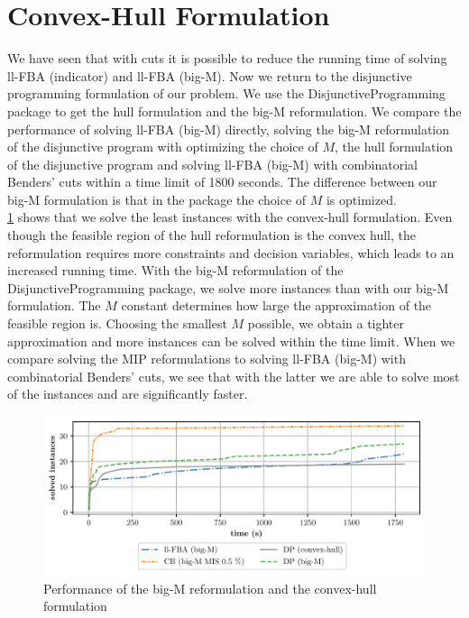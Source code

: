 \section{Convex-Hull Formulation} \label{section:results_dp}
We have seen that with cuts it is possible to reduce the running time of solving \textsf{ll-FBA (indicator)} and \textsf{ll-FBA (big-M)}. Now we return to the disjunctive programming formulation of our problem. We use the \textsf{DisjunctiveProgramming} package to get the hull formulation and the big-M reformulation. We compare the performance of solving \textsf{ll-FBA (big-M)} directly, solving the big-M reformulation of the disjunctive program with optimizing the choice of $M$, the hull formulation of the disjunctive program and solving \textsf{ll-FBA (big-M)} with combinatorial Benders' cuts within a time limit of 1800 seconds. The difference between our big-M formulation is that in the package the choice of $M$ is optimized. \\
\cref{fig:dp_performance} shows that we solve the least instances with the convex-hull formulation.  
Even though the feasible region of the hull reformulation is the convex hull, the reformulation requires more constraints and decision variables, which leads to an increased running time. With the big-M reformulation of the \textsf{DisjunctiveProgramming} package, we solve more instances than with our big-M formulation. The $M$ constant determines how large the approximation of the feasible region is. Choosing the smallest $M$ possible, we obtain a tighter approximation and more instances can be solved within the time limit. When we compare solving the MIP reformulations to solving \textsf{ll-FBA (big-M)} with combinatorial Benders' cuts, we see that with the latter we are able to solve most of the instances and are significantly faster.

\begin{figure}[h!]
    \centering
    \includegraphics[width=1.0\textwidth]{Images/comparison_dp.pdf}
    \caption{\label{fig:dp_performance} Performance of the big-M reformulation and the convex-hull formulation}
\end{figure}

